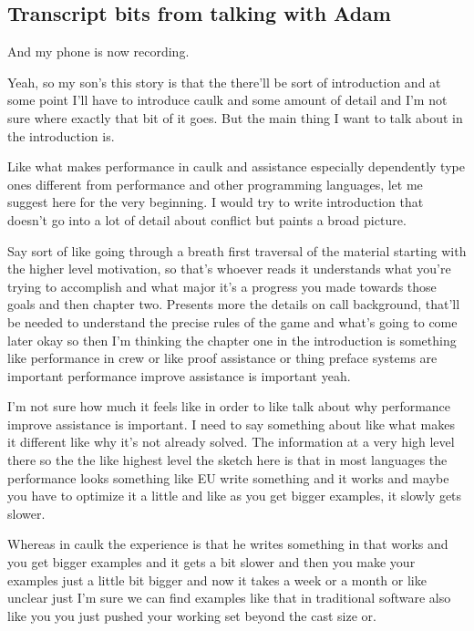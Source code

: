 \begin{subappendices}

\section{Transcript bits from talking with Adam}
And my phone is now recording.

Yeah, so my son's this story is that the there'll be sort of introduction and at some point I'll have to introduce caulk and some amount of detail and I'm not sure where exactly that bit of it goes. But the main thing I want to talk about in the introduction is.

Like what makes performance in caulk and assistance especially dependently type ones different from performance and other programming languages, let me suggest here for the very beginning. I would try to write introduction that doesn't go into a lot of detail about conflict but paints a broad picture.

Say sort of like going through a breath first traversal of the material starting with the higher level motivation, so that's whoever reads it understands what you're trying to accomplish and what major it's a progress you made towards those goals and then chapter two. Presents more the details on call background, that'll be needed to understand the precise rules of the game and what's going to come later okay so then I'm thinking the chapter one in the introduction is something like performance in crew or like proof assistance or thing preface systems are important performance improve assistance is important yeah.

I'm not sure how much it feels like in order to like talk about why performance improve assistance is important. I need to say something about like what makes it different like why it's not already solved. The information at a very high level there so the the like highest level the sketch here is that in most languages the performance looks something like EU write something and it works and maybe you have to optimize it a little and like as you get bigger examples, it slowly gets slower.

Whereas in caulk the experience is that he writes something in that works and you get bigger examples and it gets a bit slower and then you make your examples just a little bit bigger and now it takes a week or a month or like unclear just I'm sure we can find examples like that in traditional software also like you you just pushed your working set beyond the cast size or.


\end{subappendices}
